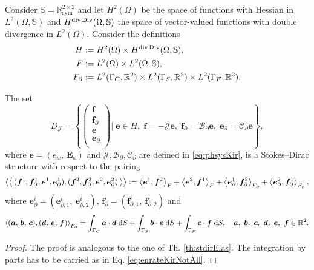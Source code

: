 \begin{theorem}\label{th:stdirKir}
	Consider $\mathbb{S} = \mathbb{R}^{2\times 2}_{\text{sym}}$ and
	let $H^{2}(\Omega)$ be the space of functions with Hessian in $L^2(\Omega, \mathbb{S})$ and $H^{\div\Div}  (\Omega, \mathbb{S})$ the space of vector-valued functions with double divergence in $L^2(\Omega)$. Consider the definitions
	\begin{align*}
	H &:=H^{2}(\Omega) \times H^{\div\Div}(\Omega, \mathbb{S}), \\
	F &:= L^2(\Omega) \times L^2(\Omega, \mathbb{S}), \\
	F_\partial &:= L^2(\Gamma_C, \mathbb{R}^2) \times L^2(\Gamma_S, \mathbb{R}^2) \times L^2(\Gamma_F, \mathbb{R}^2). 
	\end{align*}
	
	The set 
	\begin{equation}
	{D}_{\mathcal{J}} = \left\{
	\begin{pmatrix}
	\bm{f} \\ \bm{f}_\partial \\ \bm{e} \\ \bm{e}_\partial \\
	\end{pmatrix}
	\vert \;
	\bm{e} \in H, \; \bm{f} = -\mathcal{J} \bm{e}, \;\bm{f}_\partial = \mathcal{B}_\partial \bm{e}, \; \bm{e}_\partial = \mathcal{C}_\partial \bm{e}   \right\},
	\end{equation}
	where $\bm{e} = ({e}_w, \, \bm{E}_\kappa)$ and $\mathcal{J, B_\partial, C_\partial}$ are defined in \eqref{eq:phsysKir}, is a Stokes–Dirac structure with respect to the pairing
	\begin{equation}\label{eq:bilinearKir}
	\bilprod{(\bm{f}^1, \bm{f}_{\partial}^1, \bm{e}^1, \bm{e}_{\partial}^1)}{(\bm{f}^2, \bm{f}_{\partial}^2, \bm{e}^2, \bm{e}_{\partial}^2)}  := \inner[F]{\bm{e}^1}{\bm{f}^2} + \inner[F]{\bm{e}^2}{\bm{f}^1} + \inner[F_\partial]{\bm{e}_{\partial}^1}{\bm{f}_{\partial}^2} + \inner[F_\partial]{\bm{e}_{\partial}^2}{\bm{f}_{\partial}^1},
	\end{equation}
	where $\bm{e}_{\partial}^i = (\bm{e}_{\partial, 1}^i, \ \bm{e}_{\partial, 2}^i), \, \bm{f}_{\partial}^i = (\bm{f}_{\partial, 1}^i, \ \bm{f}_{\partial, 2}^i)$ and
	\begin{equation*}
	\inner[F_\partial]{(\bm{a}, \, \bm{b}, \, \bm{c})}{(\bm{d}, \, \bm{e}, \, \bm{f})} = \int_{\Gamma_C} \bm{a} \cdot \bm{d} \d{S} + \int_{\Gamma_S} \bm{b} \cdot \bm{e} \d{S}  + \int_{\Gamma_F} \bm{c} \cdot \bm{f} \d{S}, \quad \bm{a},\ \bm{b},\ \bm{c},\ \bm{d},\ \bm{e},\ \bm{f} \in \mathbb{R}^2. 
	\end{equation*}
	
	\begin{proof}
		The proof is analogous to the one of Th. \ref{th:stdirElas}. The integration by parts has to be carried as in Eq. \eqref{eq:enrateKirNotAll}.
	\end{proof}

\end{theorem}

